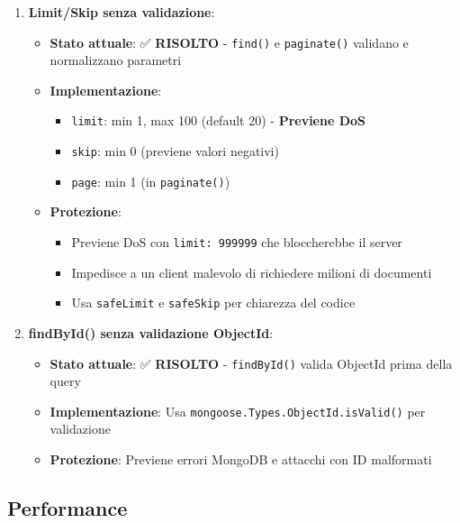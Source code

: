 \documentclass[11pt,a4paper]{article}
\begin{document}
\begin{enumerate}
    \item \textbf{Limit/Skip senza validazione}:
    \begin{itemize}
        \item \textbf{Stato attuale}: ✅ \textbf{RISOLTO} - \texttt{find()} e \texttt{paginate()} validano e normalizzano parametri
        \item \textbf{Implementazione}: 
        \begin{itemize}
            \item \texttt{limit}: min 1, max 100 (default 20) - \textbf{Previene DoS}
            \item \texttt{skip}: min 0 (previene valori negativi)
            \item \texttt{page}: min 1 (in \texttt{paginate()})
        \end{itemize}
        \item \textbf{Protezione}: 
        \begin{itemize}
            \item Previene DoS con \texttt{limit: 999999} che bloccherebbe il server
            \item Impedisce a un client malevolo di richiedere milioni di documenti
            \item Usa \texttt{safeLimit} e \texttt{safeSkip} per chiarezza del codice
        \end{itemize}
    \end{itemize}
    
    \item \textbf{findById() senza validazione ObjectId}:
    \begin{itemize}
        \item \textbf{Stato attuale}: ✅ \textbf{RISOLTO} - \texttt{findById()} valida ObjectId prima della query
        \item \textbf{Implementazione}: Usa \texttt{mongoose.Types.ObjectId.isValid()} per validazione
        \item \textbf{Protezione}: Previene errori MongoDB e attacchi con ID malformati
    \end{itemize}
\end{enumerate}

\subsection{Performance}
\end{document}
